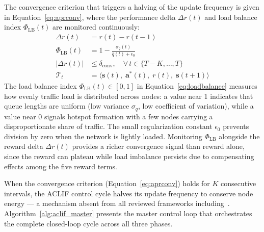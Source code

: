 \documentclass[a4paper]{cas-dc}
\numberwithin{equation}{section}
\begin{document}
The convergence criterion that triggers a halving of the update frequency is given in Equation~\ref{eq:aprconv}, where the performance delta $\Delta r(t)$ and load balance index $\Phi_{\text{LB}}(t)$ are monitored continuously:
\begin{align}
\label{eq:perfedelta}
\Delta r(t)           &= r(t) - r(t-1) \\[4pt]
\label{eq:loadbalance}
\Phi_{\text{LB}}(t)   &= 1 - \frac{\sigma_q(t)}{\bar{q}(t)+\epsilon_0} \\[4pt]
\label{eq:aprconv}
|\Delta r(t)|         &\leq \delta_{\text{conv}}, \quad \forall\,t\in\{T-K,\ldots,T\} \\[4pt]
\label{eq:transition}
\mathcal{T}_t         &= \langle\mathbf{s}(t),\;\mathbf{a}^*(t),\;r(t),\;\mathbf{s}(t{+}1)\rangle
\end{align}
The load balance index $\Phi_{\text{LB}}(t)\in[0,1]$ in Equation~\ref{eq:loadbalance} measures how evenly traffic load is distributed across nodes: a value near 1 indicates that queue lengths are uniform (low variance $\sigma_q$, low coefficient of variation), while a value near 0 signals hotspot formation with a few nodes carrying a disproportionate share of traffic. The small regularization constant $\epsilon_0$ prevents division by zero when the network is lightly loaded. Monitoring $\Phi_{\text{LB}}$ alongside the reward delta $\Delta r(t)$ provides a richer convergence signal than reward alone, since the reward can plateau while load imbalance persists due to compensating effects among the five reward terms.

When the convergence criterion (Equation~\ref{eq:aprconv}) holds for $K$ consecutive intervals, the ACLIF control cycle halves its update frequency to conserve node energy --- a mechanism absent from all reviewed frameworks including~\cite{Bhushan2025}. Algorithm~\ref{alg:aclif_master} presents the master control loop that orchestrates the complete closed-loop cycle across all three phases.
\end{document}
